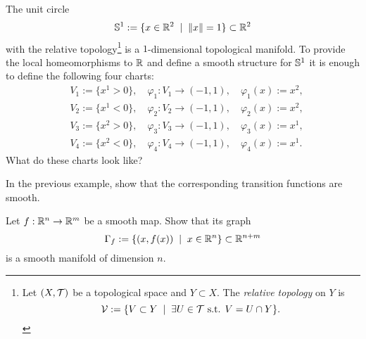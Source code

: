 \begin{example}\label{ex:S1emb}
	The unit circle
	\begin{equation}
		\mathbb{S}^1 := \{x\in\mathbb{R}^2 \;\mid\; \|x\|=1\}\subset\mathbb{R}^2
	\end{equation}
	with the relative topology\footnote{Let $(X,\mathcal{T})$ be a topological space and $Y\subset X$. The \emph{relative topology} on $Y$ is \begin{equation}\mathcal{V}:=\{V\subset Y\;\mid\;\exists U\in\mathcal{T} \mbox{ s.t. } V = U \cap Y\}.\end{equation}} is a $1$-dimensional topological manifold.
	To provide the local homeomorphisms to $\mathbb{R}$ and define a smooth structure for $\mathbb{S}^1$ it is enough to define the following four charts:
	\begin{equation}
		\begin{aligned}
			 & V_1 := \{ x^1 > 0 \},\quad \varphi_1: V_1 \to (-1, 1), \quad \varphi_1(x) := x^2, \\
			 & V_2 := \{ x^1 < 0 \},\quad \varphi_2: V_2 \to (-1, 1), \quad \varphi_2(x) := x^2, \\
			 & V_3 := \{ x^2 > 0 \},\quad \varphi_3: V_3 \to (-1, 1), \quad \varphi_3(x) := x^1, \\
			 & V_4 := \{ x^2 < 0 \},\quad \varphi_4: V_4 \to (-1, 1), \quad \varphi_4(x) := x^1.
		\end{aligned}
	\end{equation}
	What do these charts look like?
\end{example}
\begin{exercise}
	In the previous example, show that the corresponding transition functions are smooth.
\end{exercise}

\begin{exercise}
	Let $f: \mathbb{R}^n \to \mathbb{R}^m$ be a smooth map.
	Show that its graph
	\begin{equation}
		\Gamma_f := \{(x, f(x)) \;\mid\; x\in\mathbb{R}^n\} \subset\mathbb{R}^{n+m}
	\end{equation}
	is a smooth manifold of dimension $n$.
\end{exercise}

